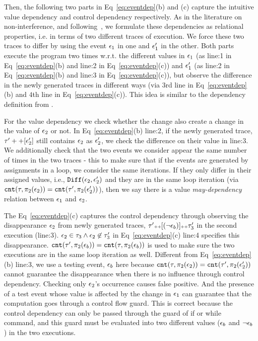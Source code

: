 {Then, the following two parts in Eq~\ref{eq:eventdep}(b) and (c) capture the intuitive value dependency and control dependency respectively. 
As in the literature on non-interference, and following~\cite{Cousot19a}, we formulate these dependencies as relational properties, i.e. in terms of two different traces of execution. 
We force these two traces to differ by using the event $\mathtt{\epsilon}_1$ in one and $\mathtt{\epsilon}_1'$ in the other. 
Both parts execute the program two times w.r.t. the different values in $\mathtt{\epsilon}_1$ (as line:1 in Eq~\ref{eq:eventdep}(b) and line:2 in Eq~\ref{eq:eventdep}(c))
and $\mathtt{\epsilon}_1'$ (as line:2 in Eq~\ref{eq:eventdep}(b) and line:3 in Eq~\ref{eq:eventdep}(c)), 
but observe the difference in the newly generated traces in different ways (via $3$rd line in Eq~\ref{eq:eventdep}(b) and $4$th line in Eq~\ref{eq:eventdep}(c)). This idea is similar to the dependency definition from \cite{Cousot19a}.
}

{For the value dependency we check whether the change also create a change in the value of $\mathtt{\epsilon}_2$ or not.
In Eq~\ref{eq:eventdep}(b) line:2, if the newly generated trace, $\mathtt{\tau}' ++ [\mathtt{\epsilon}_2']$ still contains $\mathtt{\epsilon}_2$ as $\mathtt{\epsilon}_2'$, we check the difference on their value in line:3.
We additionally check that the two events we consider appear the same number of times in the two traces - this to make sure that if the events are generated by assignments in a loop, we consider the same iterations. 
If they only differ in their assigned values, i.e., $\mathtt{Diff}(\mathtt{\epsilon}_2, \mathtt{\epsilon}_2')$ and
they are in the same loop iteration (via $\mathtt{cnt}(\mathtt{\tau}, \pi_2(\mathtt{\epsilon}_2)) = \mathtt{cnt}(\mathtt{\tau}', \pi_2(\mathtt{\epsilon}_2'))$),
then we say there is a value \emph{may-dependency} relation between $\mathtt{\epsilon}_1$ and $\mathtt{\epsilon}_2$.}

{The Eq~\ref{eq:eventdep}(c) captures the control dependency through observing the disappearance $\mathtt{\epsilon}_2$ from newly generated traces, $\mathtt{\tau}' {\scriptscriptstyle ++} [(\neg \mathtt{\epsilon}_b)] {\scriptscriptstyle ++} \mathtt{\tau}_3'$ in the second execution (line:3).
$\mathtt{\epsilon}_2 \in \mathtt{\tau}_3 \land \mathtt{\epsilon}_2 \not\in \mathtt{\tau}_3'$ in Eq~\ref{eq:eventdep}(c) line:4 specifies this disappearance.
$\mathtt{cnt}(\mathtt{\tau}', \pi_2(\mathtt{\epsilon}_b)) = \mathtt{cnt}(\mathtt{\tau}, \pi_2(\mathtt{\epsilon}_b))$ is used to make sure the two executions are
in the same loop iteration as well.
Different from Eq~\ref{eq:eventdep}(b) line:3,
we use a testing event, $\mathtt{\epsilon}_b$ here because
$\mathtt{cnt}(\mathtt{\tau}, \pi_2(\mathtt{\epsilon}_2)) = \mathtt{cnt}(\mathtt{\tau}', \pi_2(\mathtt{\epsilon}_2'))$ cannot guarantee the disappearance
when there is no influence through control dependency. Checking only $\mathtt{\epsilon}_2$'s occurrence causes false positive.
And the presence of a test event whose value is affected by the change in $\mathtt{\epsilon}_1$
can guarantee that the computation goes through a control flow guard.
This is correct because the control dependency can only be passed through the guard of if or while command,
and this guard must be evaluated into two different values ($\mathtt{\epsilon}_b$ and $\neg \mathtt{\epsilon}_b$) in the two executions.
}

